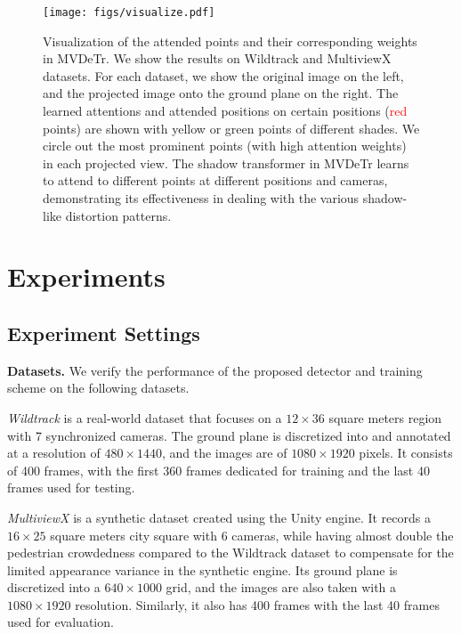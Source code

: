 \documentclass[sigconf,authorversion,nonacm]{acmart}
\begin{document}
\begin{figure*}[h]
  \centering
  \texttt{[image: figs/visualize.pdf]}
  \caption{Visualization of the attended points and their corresponding weights in MVDeTr. We show the results on Wildtrack and MultiviewX datasets. For each dataset, we show the original image on the left, and the projected image onto the ground plane on the right. The learned attentions and attended positions on certain positions (\textcolor{red}{red} points) are shown with \textcolor{myyellow}{yellow} or \textcolor{mygreen}{green} points of different shades. We circle out the most prominent points (with high attention weights) in each projected view. The shadow transformer in MVDeTr learns to attend to different points at different positions and cameras, demonstrating its effectiveness in dealing with the various shadow-like distortion patterns. 
  }
  \label{fig:visual}
\end{figure*}





\section{Experiments}
\subsection{Experiment Settings}
\textbf{Datasets.} We verify the performance of the proposed detector and training scheme on the following datasets.

\textit{Wildtrack} \cite{chavdarova2018wildtrack} is a real-world dataset that focuses on a $12 \times 36$ square meters region with 7 synchronized cameras. The ground plane is discretized into and annotated at a resolution of $480 \times 1440$, and the images are of $1080 \times 1920$ pixels. It consists of 400 frames, with the first 360 frames dedicated for training and the last 40 frames used for testing. 

\textit{MultiviewX} \cite{hou2020multiview} is a synthetic dataset created using the Unity \cite{unity} engine. It records a $16 \times 25$ square meters city square with 6 cameras, while having almost double the pedestrian crowdedness compared to the Wildtrack dataset to compensate for the limited appearance variance in the synthetic engine. Its ground plane is discretized into a $640 \times 1000$ grid, and the images are also taken with a $1080 \times 1920$ resolution. Similarly, it also has 400 frames with the last 40 frames used for evaluation. 
\end{document}
